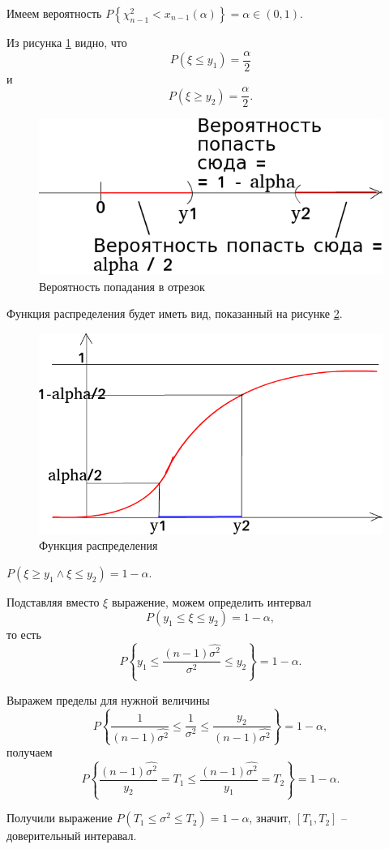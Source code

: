 \begin{enumerate}[label=\alph*)]
  Имеем вероятность
  $P \left\{ \chi_{n - 1}^2 < x_{n - 1} \left( \alpha \right) \right\} =
    \alpha \in \left( 0, 1 \right) $.

  Из рисунка \ref{fig:103} видно, что
  $$P \left( \xi \leq y_1 \right) =
    \frac{ \alpha }{2}$$
  и
  $$P \left( \xi \geq y_2 \right) =
    \frac{ \alpha }{2}.$$

  \begin{figure}[h!]
    \centering
    \includegraphics[width=.4\textwidth]{./pictures/10_3.png}
    \caption{Вероятность попадания в отрезок}
    \label{fig:103}
  \end{figure}

  Функция распределения будет иметь вид, показанный на рисунке \ref{fig:1031}.

  \begin{figure}[h!]
    \centering
    \includegraphics[width=.4\textwidth]{./pictures/10_3_1.png}
    \caption{Функция распределения}
    \label{fig:1031}
  \end{figure}

  $P \left( \xi \geq y_1 \wedge \xi \leq y_2 \right) = 1 - \alpha $.

  Подставляя вместо $ \xi $ выражение,
  можем определить интервал
  $$P \left( y_1 \leq \xi \leq y_2 \right) =
    1 - \alpha,$$
  то есть
  $$P \left\{ y_1 \leq \frac{ \left( n - 1 \right) \hat{ \sigma^2}}{ \sigma^2} \leq y_2 \right\} =
    1 - \alpha.$$

  Выражем пределы для нужной величины
  $$P \left\{
      \frac{1}{ \left( n - 1 \right) \hat{ \sigma^2}} \leq \frac{1}{ \sigma^2} \leq
      \frac{y_2}{ \left( n - 1 \right) \hat{ \sigma^2}}
    \right\} =
    1 - \alpha,$$
  получаем
  $$P \left\{
      \frac{ \left( n - 1 \right) \hat{ \sigma^2}}{y_2} = T_1 \leq
      \frac{ \left( n - 1 \right) \hat{ \sigma^2}}{y_1} = T_2
    \right\} =
    1 - \alpha.$$

  Получили выражение $P \left( T_1 \leq \sigma^2 \leq T_2 \right) = 1 - \alpha $, значит,
  $ \left[ T_1, T_2 \right] $ -- доверительный интеравал.
\end{enumerate}

